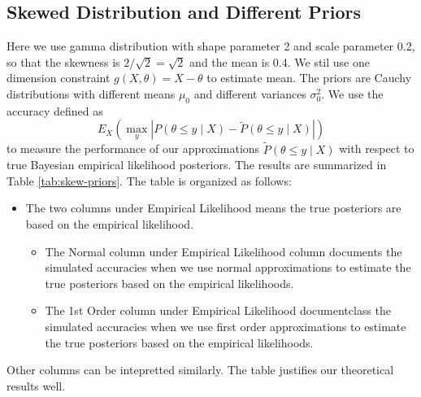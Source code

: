 {  \subsection{Skewed Distribution and Different Priors}

Here we use gamma distribution with shape parameter 2 and scale parameter 0.2,
so that the skewness is $2/ \sqrt{2}=\sqrt{2}$ and the mean is 0.4. 
We stil use one dimension constraint $g\left(X,\theta \right)=X-\theta$ to estimate mean. 
The priors are Cauchy distributions with different means $\mu_0$ and different variances $\sigma_0^2$.
We use the accuracy defined as
\[E_{X}\left(\max_{y}\left|P\left(\theta\le y\mid X\right)-\tilde{P}\left(\theta\le y\mid X\right)\right|\right)\]
to measure the performance of our approximations  $\tilde{P}\left(\theta\le y\mid X\right)$ with respect to true Bayesian empirical likelihood posteriors.
The results are summarized in Table \ref{tab:skew-priors}.
The table is organized as follows:
\begin{itemize}
\item The two columns under Empirical Likelihood means the true posteriors are based on the empirical likelihood.
\begin{itemize}
\item The Normal column under Empirical Likelihood column documents the simulated accuracies when we use normal approximations to estimate the true posteriors based on the empirical likelihoods. 
\item The 1st Order column under Empirical Likelihood documentclass the simulated accuracies when we use first order approximations to estimate the true posteriors based on the empirical likelihoods.
 \end{itemize}
 \end{itemize}
 Other columns can be intepretted similarly. 
  The table justifies our theoretical results well.
\begin{table}[h]
\centering

\end{table}}
